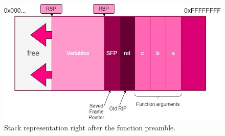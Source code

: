 \documentclass[12pt]{report} %
\begin{document}
\begin{figure}[H]
	\centering
	\includegraphics[width=14cm]{stack.jpg}
	\caption{Stack representation right after the function preamble.}
	\label{fig:stack}
\end{figure}
\end{document}
